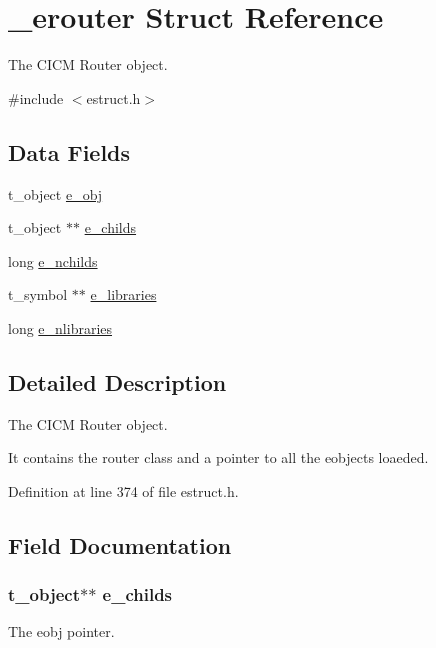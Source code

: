\hypertarget{struct__erouter}{\section{\-\_\-erouter Struct Reference}
\label{struct__erouter}
}


The C\-I\-C\-M Router object.  




{\ttfamily \#include $<$estruct.\-h$>$}

\subsection*{Data Fields}
\begin{DoxyCompactItemize}
\item 
t\-\_\-object \hyperlink{struct__erouter_a337dd8dd1771ebe57e90886d4fdfe92d}{e\-\_\-obj}
\item 
t\-\_\-object $\ast$$\ast$ \hyperlink{struct__erouter_a5484fdcb775740c1c4dedcd94b4580ab}{e\-\_\-childs}
\item 
long \hyperlink{struct__erouter_aae6cef9e2d4de46e690ad868953d0923}{e\-\_\-nchilds}
\item 
t\-\_\-symbol $\ast$$\ast$ \hyperlink{struct__erouter_ad4cb6c25f09dfe6806fde606969accd5}{e\-\_\-libraries}
\item 
long \hyperlink{struct__erouter_a8b3fb033a6ba10fb08f5353a71dec2c7}{e\-\_\-nlibraries}
\end{DoxyCompactItemize}


\subsection{Detailed Description}
The C\-I\-C\-M Router object. 

It contains the router class and a pointer to all the eobjects loaeded. 

Definition at line 374 of file estruct.\-h.



\subsection{Field Documentation}
\hypertarget{struct__erouter_a5484fdcb775740c1c4dedcd94b4580ab}{
\subsubsection[{e\-\_\-childs}]{\setlength{\rightskip}{0pt plus 5cm}t\-\_\-object$\ast$$\ast$ e\-\_\-childs}}\label{struct__erouter_a5484fdcb775740c1c4dedcd94b4580ab}
The eobj pointer. 

